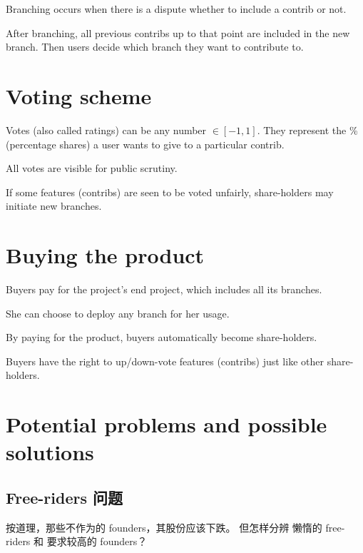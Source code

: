 \documentclass[12pt, orivec]{article}
\newcommand{\cc}[2]{#1}
\newcommand{\cc}[2]{#2}
\begin{document}
Branching occurs when there is a dispute whether to include a contrib or not.

After branching, all previous contribs up to that point are included in the new branch.  Then users decide which branch they want to contribute to.



\section{Voting scheme}

Votes (also called ratings) can be any number $\in [-1,1]$.  They represent the \% (percentage shares) a user wants to give to a particular contrib.

All votes are visible for public scrutiny.

If some features (contribs) are seen to be voted unfairly, share-holders may initiate new branches.

\section{Buying the product}

Buyers pay for the project's end project, which includes all its branches.

She can choose to deploy any branch for her usage.

By paying for the product, buyers automatically become share-holders.

Buyers have the right to up/down-vote features (contribs) just like other share-holders.

\pagebreak

\section{Potential problems and possible solutions}
\footnotesize

\subsection{\cc{Free-riders 问题}{The problem of free-riders}}

\cc{
按道理，那些不作为的 founders，其股份应该下跌。  但怎样分辨 懒惰的 free-riders 和 要求较高的 founders？
}{
In principle, if a founder hoards shares without performing useful work, his shares in the company should be reduced.	 But how could we distinguish between lazy free-riders and someone who has high standards for other people's work?
}
\end{document}
